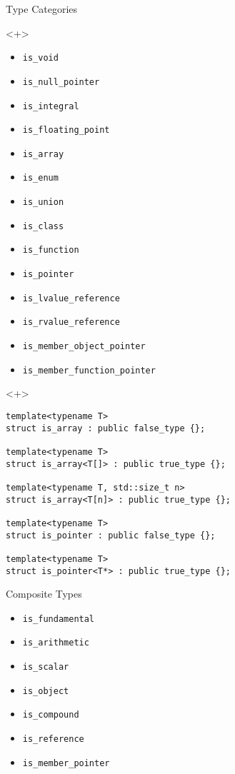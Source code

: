 \documentclass[table]{beamer}
\begin{document}
\begin{frame}[fragile]{Type Categories}
  \begin{onlyenv}<+>
    \begin{itemize}
    \item \texttt{is\_void}
    \item \texttt{is\_null\_pointer}
    \item \texttt{is\_integral}
    \item \texttt{is\_floating\_point}
    \item \texttt{is\_array}
    \item \texttt{is\_enum}
    \item \texttt{is\_union}
    \item \texttt{is\_class}
    \item \texttt{is\_function}
    \item \texttt{is\_pointer}
    \item \texttt{is\_lvalue\_reference}
    \item \texttt{is\_rvalue\_reference}
    \item \texttt{is\_member\_object\_pointer}
    \item \texttt{is\_member\_function\_pointer}
    \end{itemize}
  \end{onlyenv}

  \begin{onlyenv}<+>
    \begin{verbatim}
template<typename T>
struct is_array : public false_type {};

template<typename T>
struct is_array<T[]> : public true_type {};

template<typename T, std::size_t n>
struct is_array<T[n]> : public true_type {};

template<typename T>
struct is_pointer : public false_type {};

template<typename T>
struct is_pointer<T*> : public true_type {};
    \end{verbatim}
  \end{onlyenv}
\end{frame}

\begin{frame}{Composite Types}
  \begin{itemize}
  \item \texttt{is\_fundamental}
  \item \texttt{is\_arithmetic}
  \item \texttt{is\_scalar}
  \item \texttt{is\_object}
  \item \texttt{is\_compound}
  \item \texttt{is\_reference}
  \item \texttt{is\_member\_pointer}
  \end{itemize}
\end{frame}
\end{document}
